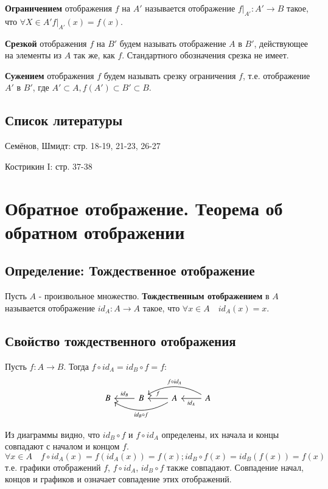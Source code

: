 \documentclass{article}
\begin{document}
\textbf{Ограничением} отображения $f$ на $A'$ называется отображение ${f|}_{A'}: A' \rightarrow B$ такое, что $\forall X \in A' {f|}_{A'}(x) = f(x)$.

\textbf{Срезкой} отображения $f$ на $B'$ будем называть отображение $A$ в $B'$, действующее на элементы из $A$ так же, как $f$. Стандартного обозначения срезка не имеет.

\textbf{Сужением} отображения $f$ будем называть срезку ограничения $f$, т.е. отображение $A'$ в $B'$, где $A' \subset A, f(A') \subset B' \subset B$.

\subsection{Список литературы}

Семёнов, Шмидт: стр. 18-19, 21-23, 26-27

Кострикин I: стр. 37-38


\newpage
\section{Обратное отображение. Теорема об обратном отображении}
\subsection{Определение: Тождественное отображение}
Пусть $A$ - произвольное множество. \textbf{Тождественным отображением} в $A$ называется отображение $id_A: A \rightarrow A$ такое, что $\forall x \in A \quad id_A(x) = x$.

\subsection{Свойство тождественного отображения}
Пусть $f: A \rightarrow B$. Тогда $f \circ id_A = id_B \circ f = f$:
%
\[
\begin{tikzcd}
B &B \lar["id_B"'] &A \ar[ll, bend left, "id_B \circ f"] \lar["f"'] &A \lar["id_A"] \ar[ll, bend right, "f \circ id_A"'] 
\end{tikzcd}
\]
%

Из диаграммы видно, что $id_B \circ f$ и $f \circ id_A$ определены, их начала и концы совпадают с началом и концом $f$. \[
	\forall x \in A \quad f \circ id_A(x) = f(id_A(x)) = f(x); id_B \circ f(x) = id_B(f(x)) = f(x)
\] т.е. графики отображений $f$, $f \circ id_A$, $id_B \circ f$ также совпадают. Совпадение начал, концов и графиков и означает совпадение этих отображений.
\end{document}
